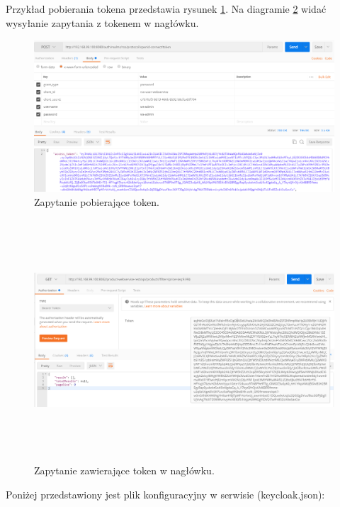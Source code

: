 \documentclass[11pt,a4paper,twoside]{article}
\begin{document}
Przykład pobierania tokena przedstawia rysunek \ref{pobieranieTokena}. Na diagramie \ref{zapytanieZTokenem} widać wysyłanie zapytania z tokenem w nagłówku.

\begin{figure}[ht]
\caption{Zapytanie pobierające token.}
\label{pobieranieTokena}
\centering
\includegraphics[height=8.cm, width=15.7cm]{requestForToken}
\end{figure}

\begin{figure}[ht]
\caption{Zapytanie zawierające token w nagłówku.}
\label{zapytanieZTokenem}
\centering
\includegraphics[height=9cm, width=15.7cm]{requestWithToken}
\end{figure}

Poniżej przedstawiony jest plik konfiguracyjny w serwisie (keycloak.json):
\end{document}
